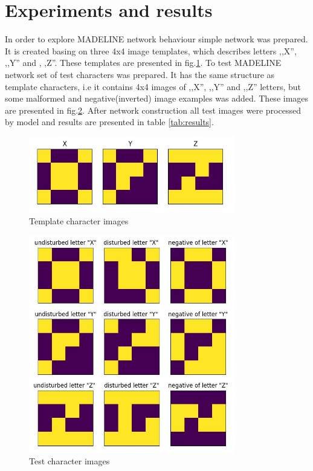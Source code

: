 \documentclass{classrep}
\begin{document}
    \section{Experiments and results}
    \label{results} {
        In order to explore MADELINE network behaviour simple network was prepared. It
        is created basing on three 4x4 image templates, which describes letters ,,X'',
        ,,Y'' and , ,Z''. These templates are presented in fig.\ref{fig:template_images}.
        To test MADELINE network set of test characters was prepared. It has the same
        structure as template characters, i.e it contains 4x4 images of ,,X'', ,,Y''
        and ,,Z'' letters, but some malformed and negative(inverted) image examples was
        added. These images are presented in fig.\ref{fig:test_images}. After network
        construction all test images were processed by model and results are presented
        in table \ref{tab:results}.

        \begin{figure}[!htbp]
            \centering
            \includegraphics[width=0.8\textwidth]{img/template_images.jpg}
            \caption{Template character images}
            \label{fig:template_images}
        \end{figure}
        \FloatBarrier

        \begin{figure}[!htbp]
            \centering
            \includegraphics[width=0.8\textwidth]{img/test_images.jpg}
            \caption{Test character images}
            \label{fig:test_images}
        \end{figure}
        \FloatBarrier

}
\end{document}
